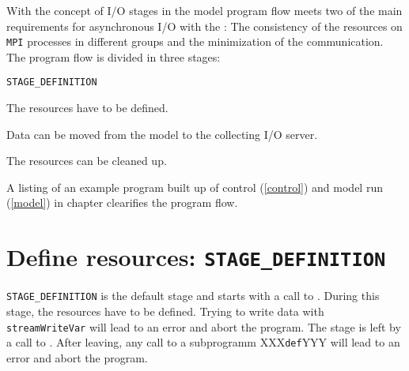 With the concept of I/O stages in the model program flow {\pio} meets two of the 
main requirements for asynchronous I/O with the {\CDI}: The consistency of the 
resources on {\tt MPI} processes in different groups and the minimization of the 
communication. The program flow is divided in three stages:
\smallskip

\hspace*{4mm}\begin{minipage}[]{15cm}
\begin{deflist}{\tt STAGE\_DEFINITION \ } 
\item[{\htmlref{\tt STAGE\_DEFINITION}{STAGEDEFINITION}}]
The {\CDI} resources have to be defined.
\item[{\htmlref{\tt STAGE\_TIMELOOP}{STAGETIMELOOP}}]
Data can be moved from the model to the collecting I/O server.
\item[{\htmlref{\tt STAGE\_CLEANUP}{STAGECLEANUP}}]
The {\CDI} resources can be cleaned up.
\end{deflist}
\end{minipage}
\bigskip

A listing of an example program built up of control (\ref{control}) and 
model run (\ref{model}) in chapter  clearifies the program flow.

\section{Define {\CDI} resources: {\tt STAGE\_DEFINITION}}
\label{STAGEDEFINITION}
{\tt STAGE\_DEFINITION} is the default stage and starts with a call to 
{}. During this stage, the {\CDI} resources have to 
be defined. Trying to write data with {\CDI} {\tt streamWriteVar} will lead to an 
error and abort the program. The stage is left by a call to 
{}. After leaving, any call to a {\CDI} 
subprogramm XXX{\tt def}YYY will lead to an error and abort the program. 

